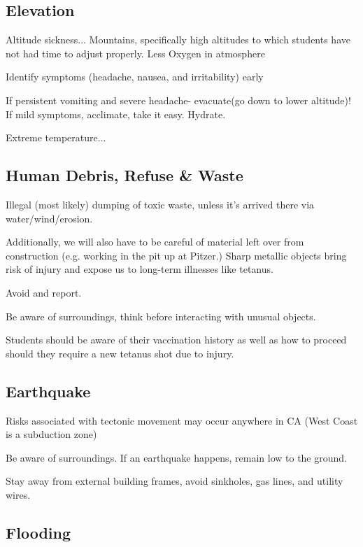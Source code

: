\documentclass[12pt]{../SOP4_alpha}\usepackage[]{graphicx}\usepackage[]{color}
\begin{document}
\subsection{Elevation}

\NP Altitude sickness... Mountains, specifically high altitudes to which students have not had time to adjust properly. Less Oxygen in atmosphere

\NP Identify symptoms (headache, nausea, and irritability) early

\NP If persistent vomiting and severe headache- evacuate(go down to lower altitude)! If mild symptoms, acclimate, take it easy. Hydrate.

\NP Extreme temperature...

\NP 

\NP 

\subsection{Human Debris, Refuse \& Waste}

Illegal (most likely) dumping of toxic waste, unless it’s arrived there via water/wind/erosion.


\NP Additionally, we will also have to be careful of material left over from construction (e.g. working in the pit up at Pitzer.) Sharp metallic objects bring risk of injury and expose us to long-term illnesses like tetanus.

\NP Avoid and report.

\NP Be aware of surroundings, think before interacting with unusual objects.

\NP Students should be aware of their vaccination history as well as how to proceed should they require a new tetanus shot due to injury.

\subsection{Earthquake}

\NP Risks associated with tectonic movement may occur anywhere in CA (West Coast is a subduction zone)

\NP Be aware of surroundings. If an earthquake happens, remain low to the ground.

\NP Stay away from external building frames, avoid sinkholes, gas lines, and utility wires.

\subsection{Flooding}
\end{document}
